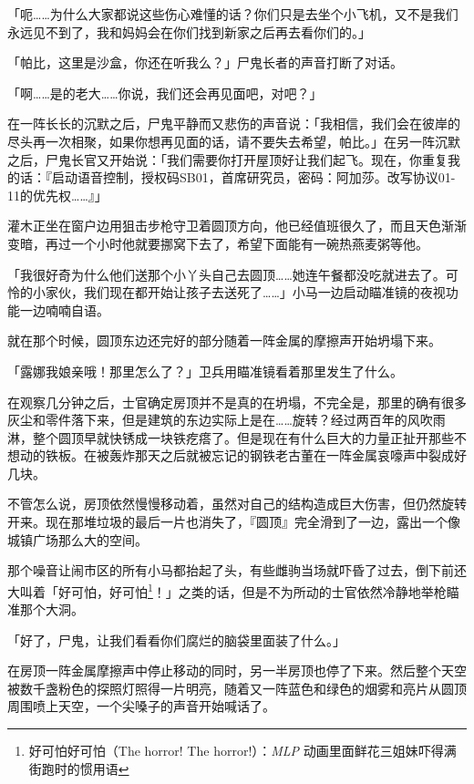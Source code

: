 「呃……为什么大家都说这些伤心难懂的话？你们只是去坐个小飞机，又不是我们永远见不到了，我和妈妈会在你们找到新家之后再去看你们的。」

「帕比，这里是沙盒，你还在听我么？」尸鬼长者的声音打断了对话。

「啊……是的老大……你说，我们还会再见面吧，对吧？」

在一阵长长的沉默之后，尸鬼平静而又悲伤的声音说：「我相信，我们会在彼岸的尽头再一次相聚，如果你想再见面的话，请不要失去希望，帕比。」在另一阵沉默之后，尸鬼长官又开始说：「我们需要你打开屋顶好让我们起飞。现在，你重复我的话：『启动语音控制，授权码SB01，首席研究员，密码：阿加莎。改写协议01-11的优先权……』」

\horizonline


灌木正坐在窗户边用狙击步枪守卫着圆顶方向，他已经值班很久了，而且天色渐渐变暗，再过一个小时他就要挪窝下去了，希望下面能有一碗热燕麦粥等他。

「我很好奇为什么他们送那个小丫头自己去圆顶……她连午餐都没吃就进去了。可怜的小家伙，我们现在都开始让孩子去送死了……」小马一边启动瞄准镜的夜视功能一边喃喃自语。

就在那个时候，圆顶东边还完好的部分随着一阵金属的摩擦声开始坍塌下来。

「露娜我娘亲哦！那里怎么了？」卫兵用瞄准镜看着那里发生了什么。

在观察几分钟之后，士官确定房顶并不是真的在坍塌，不完全是，那里的确有很多灰尘和零件落下来，但是建筑的东边实际上是在……旋转？经过两百年的风吹雨淋，整个圆顶早就快锈成一块铁疙瘩了。但是现在有什么巨大的力量正扯开那些不想动的铁板。在被轰炸那天之后就被忘记的钢铁老古董在一阵金属哀嚎声中裂成好几块。

不管怎么说，房顶依然慢慢移动着，虽然对自己的结构造成巨大伤害，但仍然旋转开来。现在那堆垃圾的最后一片也消失了，『圆顶』完全滑到了一边，露出一个像城镇广场那么大的空间。

那个噪音让闹市区的所有小马都抬起了头，有些雌驹当场就吓昏了过去，倒下前还大叫着「好可怕，好可怕\footnote{好可怕好可怕（The horror! The horror!）：\emph{MLP} 动画里面鲜花三姐妹吓得满街跑时的惯用语}！」之类的话，但是不为所动的士官依然冷静地举枪瞄准那个大洞。

「好了，尸鬼，让我们看看你们腐烂的脑袋里面装了什么。」

在房顶一阵金属摩擦声中停止移动的同时，另一半房顶也停了下来。然后整个天空被数千盏粉色的探照灯照得一片明亮，随着又一阵蓝色和绿色的烟雾和亮片从圆顶周围喷上天空，一个尖嗓子的声音开始喊话了。

